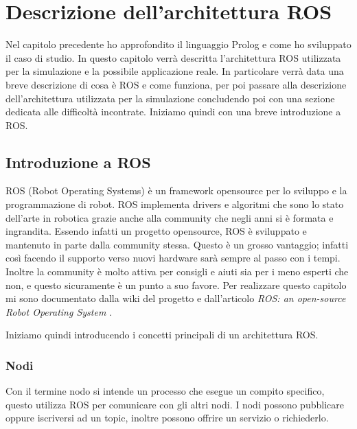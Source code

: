 \chapter{Descrizione dell'architettura ROS}
\label{cha:descrizionearchros}
Nel capitolo precedente ho approfondito il linguaggio Prolog e come ho sviluppato il caso di studio. In questo capitolo verrà descritta l'architettura ROS utilizzata per la simulazione e la possibile applicazione reale.
In particolare verrà data una breve descrizione di cosa è ROS e come funziona, per poi passare alla descrizione dell'architettura utilizzata per la simulazione concludendo poi con una sezione dedicata alle difficoltà incontrate. Iniziamo quindi con una breve introduzione a ROS.

\section{Introduzione a ROS}
\label{sec:introduzione_ros}
ROS (Robot Operating Systems) è un framework opensource per lo sviluppo e la programmazione di robot. ROS implementa drivers e algoritmi che sono lo stato dell'arte in robotica grazie anche alla community che negli anni si è formata e ingrandita.
Essendo infatti un progetto opensource, ROS è sviluppato e mantenuto in parte dalla community stessa. Questo è un grosso vantaggio; infatti così facendo il supporto verso nuovi hardware sarà sempre al passo con i tempi. Inoltre la community è molto attiva per consigli e aiuti sia per i meno esperti che non, e questo sicuramente è un punto a suo favore.
Per realizzare questo capitolo mi sono documentato dalla wiki del progetto \cite{rossite} e dall'articolo \textit{ROS: an open-source Robot Operating System} \cite{quingley2009ros}.

Iniziamo quindi introducendo i concetti principali di un architettura ROS.

\subsection{Nodi}
\label{subsec:nodi}
Con il termine nodo si intende un processo che esegue un compito specifico, questo utilizza ROS per comunicare con gli altri nodi. I nodi possono pubblicare oppure iscriversi ad un topic, inoltre possono offrire un servizio o richiederlo. 


